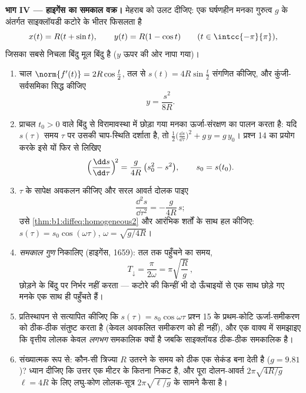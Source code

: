 \begin{problem}
\medskip \noindent\textbf{भाग IV --- हाइगेंस का समकाल वक्र।} मेहराब को उलट
दीजिए: एक घर्षणहीन मनका गुरुत्व $g$ के अंतर्गत साइक्लॉयडी कटोरे के भीतर
फिसलता है
\[
x(t) = R(t + \sin t), \qquad y(t) = R(1 - \cos t)
\qquad (t \in \intcc{-\pi}{\pi}),
\]
जिसका सबसे निचला बिंदु मूल बिंदु है ($y$ ऊपर की ओर नापा गया)।
\begin{enumerate}[resume]
  \item चाल $\norm{f'(t)} = 2R\cos\frac t2$, तल से  $s(t) =
  4R\sin\frac t2$ संगणित कीजिए, और कुंजी-सर्वसमिका सिद्ध कीजिए
        \[
        y = \frac{s^2}{8R} .
        \]
  \item प्राचल $t_0 > 0$ वाले बिंदु से विरामावस्था में छोड़ा गया मनका
  ऊर्जा-संरक्षण का पालन करता है: यदि $s(\tau)$ समय $\tau$ पर उसकी चाप-स्थिति
  दर्शाता है, तो $\frac12\bigl( \frac{\dd s}{\dd\tau}\bigr)^2 + g\,y =
  g\,y_0$। प्रश्न 14 का प्रयोग करके इसे यों फिर से लिखिए
        \[
        \Bigl(\frac{\dd s}{\dd\tau}\Bigr)^{\!2}
        = \frac{g}{4R}\,\bigl(s_0^2 - s^2\bigr),
        \qquad s_0 = s(t_0).
        \]
  \item $\tau$ के सापेक्ष अवकलन कीजिए और सरल आवर्त दोलक पाइए
        \[
        \frac{\dd^2 s}{\dd\tau^2} = -\frac{g}{4R}\,s ;
        \]
        उसे \cref{thm:b1:diffeq:homogeneous2} और आरंभिक शर्तों के साथ हल
        कीजिए: $s(\tau) = s_0\cos(\omega\tau)$, $\omega = \sqrt{g/4R}$।
  \item \emph{समकाल गुण} निकालिए (हाइगेंस, 1659): तल तक पहुँचने का समय,
        \[
        T_{\downarrow} = \frac{\pi}{2\omega}
        = \pi\sqrt{\frac Rg}\,,
        \]
        छोड़ने के बिंदु पर निर्भर नहीं करता --- कटोरे की किन्हीं भी दो
        ऊँचाइयों से एक साथ छोड़े गए मनके एक साथ ही पहुँचते हैं।
  \item प्रतिस्थापन से सत्यापित कीजिए कि $s(\tau) = s_0\cos\omega\tau$
  प्रश्न 15 के प्रथम-कोटि ऊर्जा-समीकरण को ठीक-ठीक संतुष्ट करता है (केवल
  अवकलित समीकरण को ही नहीं), और एक वाक्य में समझाइए कि वृत्तीय लोलक केवल
  \emph{लगभग} समकालिक क्यों है जबकि साइक्लॉयड ठीक-ठीक समकालिक है।
  \item संख्यात्मक रूप से: कौन-सी त्रिज्या $R$ उतरने के समय को ठीक एक सेकंड
  बना देती है ($g = 9.81$)? ध्यान दीजिए कि उत्तर एक मीटर के कितना निकट है,
  और पूरा दोलन-आवर्त $2\pi\sqrt{4R/g}$ $\ell = 4R$ के लिए लघु-कोण लोलक-सूत्र
  $2\pi\sqrt{\ell/g}$ के सामने कैसा है।
\end{enumerate}


\end{problem}
